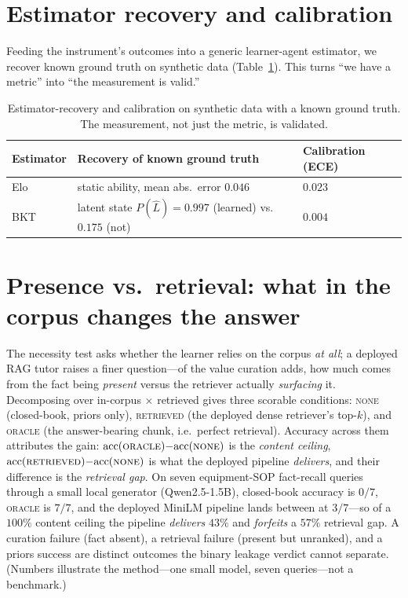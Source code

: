 \documentclass{article}
\begin{document}
\section{Estimator recovery and calibration}
\label{app:recovery}
Feeding the instrument's outcomes into a generic learner-agent estimator, we recover known ground truth
on synthetic data (Table~\ref{tab:recovery}). This turns ``we have a metric'' into ``the measurement is
valid.''

\begin{table}[h]
\centering
\small
\begin{tabular}{@{}lll@{}}
\toprule
Estimator & Recovery of known ground truth & Calibration (ECE) \\
\midrule
Elo & static ability, mean abs.\ error $0.046$ & $0.023$ \\
BKT & latent state $P(\hat L)=0.997$ (learned) vs.\ $0.175$ (not) & $0.004$ \\
\bottomrule
\end{tabular}
\caption{Estimator-recovery and calibration on synthetic data with a known ground truth. The
measurement, not just the metric, is validated.}
\label{tab:recovery}
\end{table}

\section{Presence vs.\ retrieval: what in the corpus changes the answer}
\label{app:retrieval}
The necessity test asks whether the learner relies on the corpus \emph{at all}; a deployed RAG tutor
raises a finer question---of the value curation adds, how much comes from the fact being \emph{present}
versus the retriever actually \emph{surfacing} it. Decomposing over in-corpus $\times$ retrieved gives
three scorable conditions: \textsc{none} (closed-book, priors only), \textsc{retrieved} (the deployed
dense retriever's top-$k$), and \textsc{oracle} (the answer-bearing chunk, i.e.\ perfect retrieval).
Accuracy across them attributes the gain: $\mathrm{acc}(\textsc{oracle}){-}\mathrm{acc}(\textsc{none})$
is the \emph{content ceiling}, $\mathrm{acc}(\textsc{retrieved}){-}\mathrm{acc}(\textsc{none})$ is what
the deployed pipeline \emph{delivers}, and their difference is the \emph{retrieval gap}. On seven
equipment-SOP fact-recall queries through a small local generator (Qwen2.5-1.5B), closed-book accuracy
is $0/7$, \textsc{oracle} is $7/7$, and the deployed MiniLM pipeline lands between at $3/7$---so of a
$100\%$ content ceiling the pipeline \emph{delivers} $43\%$ and \emph{forfeits} a $57\%$ retrieval gap.
A curation failure (fact absent), a retrieval failure (present but unranked), and a priors success are
distinct outcomes the binary leakage verdict cannot separate. (Numbers illustrate the method---one
small model, seven queries---not a benchmark.)

\small


\end{document}
